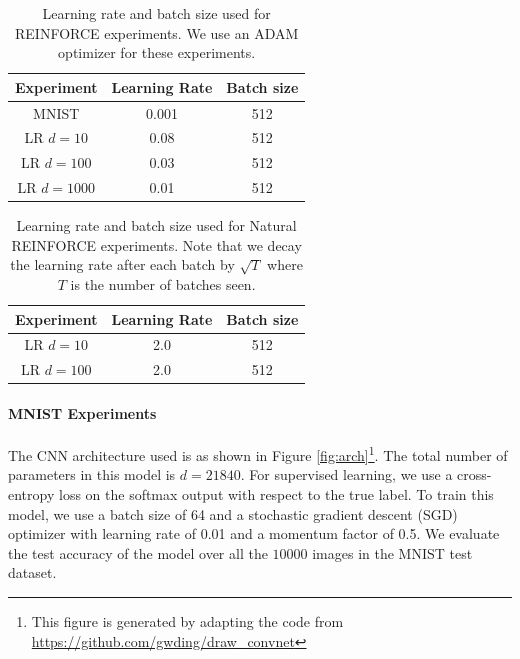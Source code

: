 \begin{table}[ht]
    \centering
    \begin{tabular}{|c|c|c|}
    \hline
    \textbf{Experiment}     &  \textbf{Learning Rate} & \textbf{Batch size}\\
    \hline
    MNIST     &  0.001 & 512\\
    \hline
    LR $d=10$ & 0.08 & 512\\
    \hline
    LR $d=100$ & 0.03 & 512\\
    \hline
    LR $d=1000$ & 0.01 & 512\\
    \hline
    \end{tabular}
    \caption{Learning rate and batch size used for REINFORCE experiments. We use an ADAM \citep{kingma2014adam} optimizer for these experiments.}
    \label{tab:hyperparam-reinforce}
\end{table}

\begin{table}[ht]
    \centering
    \begin{tabular}{|c|c|c|}
    \hline
    \textbf{Experiment}     &  \textbf{Learning Rate} & \textbf{Batch size}\\
    \hline
    LR $d=10$ & 2.0 & 512\\
    \hline
    LR $d=100$ & 2.0 & 512\\
    \hline
    \end{tabular}
    \caption{Learning rate and batch size used for Natural REINFORCE experiments. Note that we decay the learning rate after each batch by $\sqrt{T}$ where $T$ is the number of batches seen.}
    \label{tab:hyperparam-nreinforce}
\end{table}

\paragraph{MNIST Experiments}
\label{sec:mnist-details}

The CNN architecture used is as shown in Figure \ref{fig:arch}\footnote{This figure is generated by adapting the code from \url{https://github.com/gwding/draw_convnet}}. The total number of parameters in this model is $d=21840$. For supervised learning, we use a cross-entropy loss on the softmax output with respect to the true label. To train this model, we use a batch size of 64 and a stochastic gradient descent (SGD) optimizer with learning rate of 0.01 and a momentum factor of 0.5. We evaluate the test accuracy of the model over all the $10000$ images in the MNIST test dataset.


